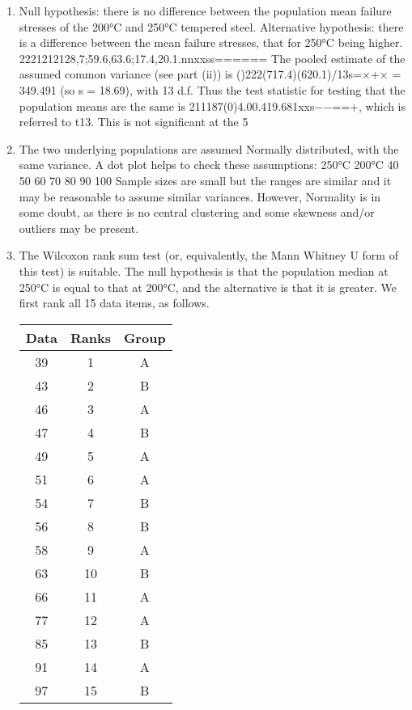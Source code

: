 \documentclass[a4paper,12pt]{article}
\begin{document}
\begin{enumerate}
\item Null hypothesis: there is no difference between the population mean failure stresses of the 200°C and 250°C tempered steel. Alternative hypothesis: there is a difference between the mean failure stresses, that for 250°C being higher.
2221212128,7;59.6,63.6;17.4,20.1.nnxxss======
The pooled estimate of the assumed common variance (see part (ii)) is ()222(717.4)(620.1)/13s=×+× = 349.491 (so s = 18.69), with 13 d.f.
Thus the test statistic for testing that the population means are the same is
211187(0)4.00.419.681xxs−−==+,
which is referred to t13. This is not significant at the 5%
\item The two underlying populations are assumed Normally distributed, with the same variance. A dot plot helps to check these assumptions:
250°C
200°C
40
50
60
70
80
90
100
Sample sizes are small but the ranges are similar and it may be reasonable to assume similar variances. However, Normality is in some doubt, as there is no central clustering and some skewness and/or outliers may be present.


\item The Wilcoxon rank sum test (or, equivalently, the Mann Whitney U form of this test) is suitable. The null hypothesis is that the population median at 250°C is equal to that at 200°C, and the alternative is that it is greater. We first rank all 15 data items, as follows.
\begin{center}
\begin{tabular}{c|c|c}
Data	&	Ranks	&	Group	\\ \hline
39	&	1	&	A	\\ \hline
43	&	2	&	B	\\ \hline
46	&	3	&	A	\\ \hline
47	&	4	&	B	\\ \hline
49	&	5	&	A	\\ \hline
51	&	6	&	A	\\ \hline
54	&	7	&	B	\\ \hline
56	&	8	&	B	\\ \hline
58	&	9	&	A	\\ \hline
63	&	10	&	B	\\ \hline
66	&	11	&	A	\\ \hline
77	&	12	&	A	\\ \hline
85	&	13	&	B	\\ \hline
91	&	14	&	A	\\ \hline
97	&	15	&	B	\\ \hline
					

\end{tabular}
\end{center}
\end{enumerate}
\end{document}
